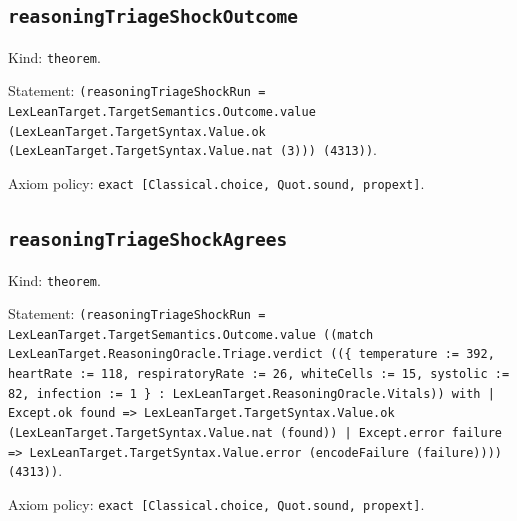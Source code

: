 \documentclass[11pt]{article}
\begin{document}
\subsection*{\texttt{reasoningTriageShockOutcome}}
\noindent Kind: \texttt{theorem}.\par
\noindent Statement: \texttt{(reasoningTriageShockRun = LexLeanTarget.TargetSemantics.Outcome.value (LexLeanTarget.TargetSyntax.Value.ok (LexLeanTarget.TargetSyntax.Value.nat (3))) (4313))}.\par
\noindent Axiom policy: \texttt{exact [Classical.choice, Quot.sound, propext]}.\par
\subsection*{\texttt{reasoningTriageShockAgrees}}
\noindent Kind: \texttt{theorem}.\par
\noindent Statement: \texttt{(reasoningTriageShockRun = LexLeanTarget.TargetSemantics.Outcome.value ((match LexLeanTarget.ReasoningOracle.Triage.verdict ((\{ temperature := 392, heartRate := 118, respiratoryRate := 26, whiteCells := 15, systolic := 82, infection := 1 \} : LexLeanTarget.ReasoningOracle.Vitals)) with | Except.ok found => LexLeanTarget.TargetSyntax.Value.ok (LexLeanTarget.TargetSyntax.Value.nat (found)) | Except.error failure => LexLeanTarget.TargetSyntax.Value.error (encodeFailure (failure)))) (4313))}.\par
\noindent Axiom policy: \texttt{exact [Classical.choice, Quot.sound, propext]}.\par
\end{document}
